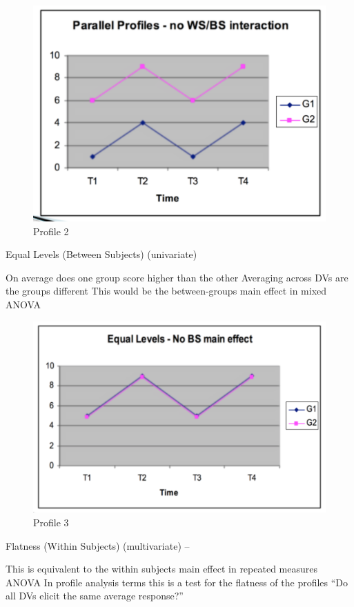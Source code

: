 \documentclass[]{book}
\theoremstyle{definition}
\theoremstyle{definition}
\theoremstyle{definition}
\theoremstyle{remark}
\begin{document}
{\begin{figure}
\centering
\includegraphics{img/jhprofile2.png}
\caption{Profile 2}
\end{figure}

Equal Levels (Between Subjects) (univariate)

On average does one group score higher than the other Averaging across
DVs are the groups different This would be the between-groups main
effect in mixed ANOVA

\begin{figure}
\centering
\includegraphics{img/jhprofile3.png}
\caption{Profile 3}
\end{figure}

Flatness (Within Subjects) (multivariate) --

This is equivalent to the within subjects main effect in repeated
measures ANOVA In profile analysis terms this is a test for the flatness
of the profiles ``Do all DVs elicit the same average response?''

}
\end{document}
